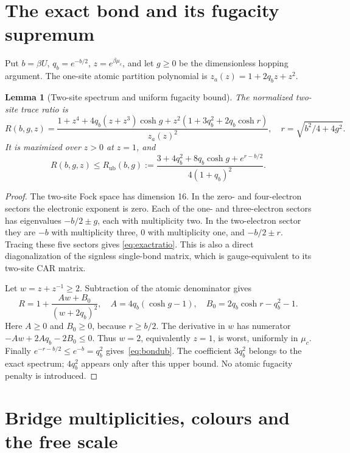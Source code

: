 \documentclass[11pt]{article}
\theoremstyle{plain}
\newtheorem{lemma}{Lemma}
\theoremstyle{remark}
\begin{document}
\section{The exact bond and its fugacity supremum}\label{sec:bond}

Put $b=\beta U$, $q_b=e^{-b/2}$, $z=e^{\beta\mu_c}$, and let $g\ge0$ be the
dimensionless hopping argument. The one-site atomic partition polynomial is
$z_a(z)=1+2q_bz+z^2$.

\begin{lemma}[Two-site spectrum and uniform fugacity bound]\label{lem:bond}
The normalized two-site trace ratio is
\begin{equation}\label{eq:exactratio}
R(b,g,z)=\frac{1+z^4+4q_b(z+z^3)\cosh g
+z^2(1+3q_b^2+2q_b\cosh r)}{z_a(z)^2},
\quad r=\sqrt{b^2/4+4g^2}.
\end{equation}
It is maximized over $z>0$ at $z=1$, and
\begin{equation}\label{eq:bondub}
R(b,g,z)\le R_{\mathrm{ub}}(b,g):=
\frac{3+4q_b^2+8q_b\cosh g+e^{r-b/2}}{4(1+q_b)^2}.
\end{equation}
\end{lemma}
\begin{proof}
The two-site Fock space has dimension 16. In the zero- and four-electron
sectors the electronic exponent is zero. Each of the one- and three-electron
sectors has eigenvalues $-b/2\pm g$, each with multiplicity two.
In the two-electron sector they are $-b$ with multiplicity three, $0$ with
multiplicity one, and $-b/2\pm r$. Tracing these five sectors gives
\eqref{eq:exactratio}. This is also a direct diagonalization of the
signless single-bond matrix, which is gauge-equivalent to its two-site CAR matrix.

Let $w=z+z^{-1}\ge2$. Subtraction of the atomic denominator gives
\[
R=1+\frac{Aw+B_0}{(w+2q_b)^2},\quad
A=4q_b(\cosh g-1),\quad B_0=2q_b\cosh r-q_b^2-1.
\]
Here $A\ge0$ and $B_0\ge0$, because $r\ge b/2$.
The derivative in $w$ has numerator $-Aw+2Aq_b-2B_0\le0$.
Thus $w=2$, equivalently $z=1$, is worst, uniformly in $\mu_c$.
Finally $e^{-r-b/2}\le e^{-b}=q_b^2$ gives~\eqref{eq:bondub}.
The coefficient $3q_b^2$ belongs to the exact spectrum; $4q_b^2$ appears
only after this upper bound. No atomic fugacity penalty is introduced.
\end{proof}

\section{Bridge multiplicities, colours and the free scale}\label{sec:weights}
\end{document}
